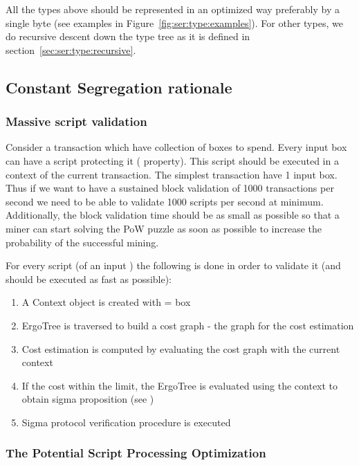 All the types above should be represented in an optimized way preferably by a single
byte (see examples in Figure~\ref{fig:ser:type:examples}). For other types, we do
recursive descent down the type tree as it is defined in
section~\ref{sec:ser:type:recursive}.

\subsection{Constant Segregation rationale}
\label{sec:appendix:motivation:segregation}

\subsubsection{Massive script validation}
\label{sec:appendix:motivation:segregation:massive}

Consider a transaction  which have  collection of boxes to spend.
Every input box can have a script protecting it ( property). This
script should be executed in a context of the current transaction. The simplest
transaction have 1 input box. Thus if we want to have a sustained block validation of
1000 transactions per second we need to be able to validate 1000 scripts per second at
minimum. Additionally, the block validation time should be as small as possible so that
a miner can start solving the PoW puzzle as soon as possible to increase the
probability of the successful mining.

For every script (of an input ) the following is done in order to
validate it (and should be executed as fast as possible):
\begin{enumerate}
    \item A Context object is created with  = box
    \item ErgoTree is traversed to build a cost graph - the graph for the cost
    estimation
    \item Cost estimation is computed by evaluating the cost graph with the current
    context 
    \item If the cost within the limit, the ErgoTree is evaluated using the context to
    obtain sigma proposition (see \hyperref[sec:type:SigmaProp]{})
    \item Sigma protocol verification procedure is executed
\end{enumerate}

\subsubsection{The Potential Script Processing Optimization}


